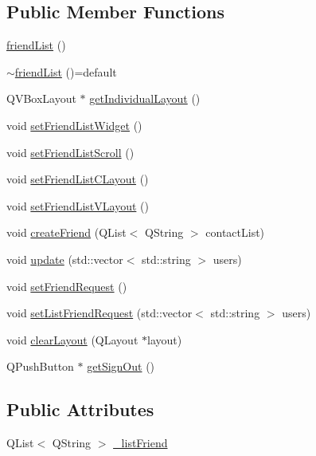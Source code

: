\subsection*{Public Member Functions}
\begin{DoxyCompactItemize}
\item 
\hyperlink{classBabel_1_1Graphic_1_1friendList_a67f40fb95c728fa710de30f0272e0c41}{friend\+List} ()
\item 
\hyperlink{classBabel_1_1Graphic_1_1friendList_a7585e6106bf01014e7b44460b6734b5a}{$\sim$friend\+List} ()=default
\item 
Q\+V\+Box\+Layout $\ast$ \hyperlink{classBabel_1_1Graphic_1_1friendList_a350dd6316af945655dc454bbb158fa6a}{get\+Individual\+Layout} ()
\item 
void \hyperlink{classBabel_1_1Graphic_1_1friendList_a91b26e41aabbf5d0bbddb21e9efa7276}{set\+Friend\+List\+Widget} ()
\item 
void \hyperlink{classBabel_1_1Graphic_1_1friendList_a94b8e7965d0cdfb100f0a7d6f473dbcf}{set\+Friend\+List\+Scroll} ()
\item 
void \hyperlink{classBabel_1_1Graphic_1_1friendList_a32f44213326ae4b1afe15b43369c8f43}{set\+Friend\+List\+C\+Layout} ()
\item 
void \hyperlink{classBabel_1_1Graphic_1_1friendList_a9f07bde459cd80c47cf571d245f9f466}{set\+Friend\+List\+V\+Layout} ()
\item 
void \hyperlink{classBabel_1_1Graphic_1_1friendList_a1d704e7684f663c836de4444c053f0fc}{create\+Friend} (Q\+List$<$ Q\+String $>$ contact\+List)
\item 
void \hyperlink{classBabel_1_1Graphic_1_1friendList_a6b8da71bb970ffe7d342bcc811582d5d}{update} (std\+::vector$<$ std\+::string $>$ users)
\item 
void \hyperlink{classBabel_1_1Graphic_1_1friendList_ae85d2ce8319de8b068b4b2667a94475d}{set\+Friend\+Request} ()
\item 
void \hyperlink{classBabel_1_1Graphic_1_1friendList_a68a9cd0acdd89379427ef24d6407110b}{set\+List\+Friend\+Request} (std\+::vector$<$ std\+::string $>$ users)
\item 
void \hyperlink{classBabel_1_1Graphic_1_1friendList_ad2d71274ba22b5888a21a27b4d80db5d}{clear\+Layout} (Q\+Layout $\ast$layout)
\item 
Q\+Push\+Button $\ast$ \hyperlink{classBabel_1_1Graphic_1_1friendList_a6fd58465eeadaa9a51d15ff8c8ab0c65}{get\+Sign\+Out} ()
\end{DoxyCompactItemize}
\subsection*{Public Attributes}
\begin{DoxyCompactItemize}
\item 
Q\+List$<$ Q\+String $>$ \hyperlink{classBabel_1_1Graphic_1_1friendList_a405ffc3f0fb75d3c3472acb3b118fbbb}{\+\_\+list\+Friend}
\end{DoxyCompactItemize}



